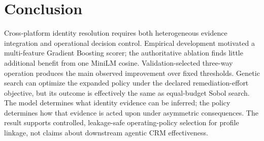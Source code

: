 \documentclass[conference]{IEEEtran}
\begin{document}
\section{Conclusion}
Cross-platform identity resolution requires both heterogeneous evidence integration and operational decision control. Empirical development motivated a multi-feature Gradient Boosting scorer; the authoritative ablation finds little additional benefit from one MiniLM cosine. Validation-selected three-way operation produces the main observed improvement over fixed thresholds. Genetic search can optimize the expanded policy under the declared remediation-effort objective, but its outcome is effectively the same as equal-budget Sobol search. The model determines what identity evidence can be inferred; the policy determines how that evidence is acted upon under asymmetric consequences. The result supports controlled, leakage-safe operating-policy selection for profile linkage, not claims about downstream agentic CRM effectiveness.



\end{document}
